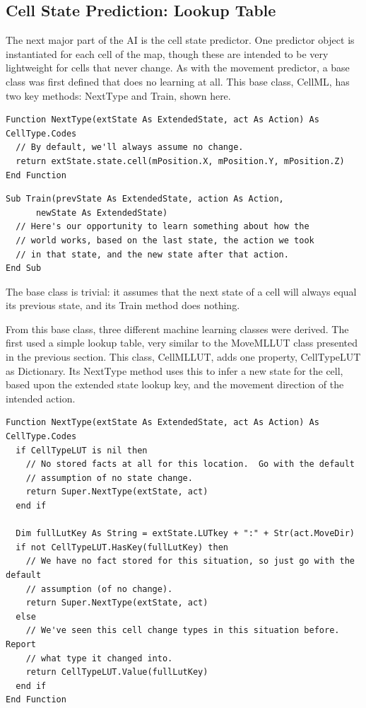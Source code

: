 \documentclass{article}
\begin{document}
\subsection{Cell State Prediction: Lookup Table}

The next major part of the AI is the cell state predictor.  One predictor object is instantiated for each cell of the map, though these are intended to be very lightweight for cells that never change.  As with the movement predictor, a base class was first defined that does no learning at all.  This base class, CellML, has two key methods: NextType and Train, shown here.

\begin{lstlisting}
Function NextType(extState As ExtendedState, act As Action) As CellType.Codes
  // By default, we'll always assume no change.
  return extState.state.cell(mPosition.X, mPosition.Y, mPosition.Z)
End Function
\end{lstlisting}

\begin{lstlisting}
Sub Train(prevState As ExtendedState, action As Action,
      newState As ExtendedState)
  // Here's our opportunity to learn something about how the
  // world works, based on the last state, the action we took
  // in that state, and the new state after that action.
End Sub
\end{lstlisting}

The base class is trivial: it assumes that the next state of a cell will always equal its previous state, and its Train method does nothing.

From this base class, three different machine learning classes were derived.  The first used a simple lookup table, very similar to the MoveMLLUT class presented in the previous section.  This class, CellMLLUT, adds one property, CellTypeLUT as Dictionary.  Its NextType method uses this to infer a new state for the cell, based upon the extended state lookup key, and the movement direction of the intended action.

\begin{lstlisting}
Function NextType(extState As ExtendedState, act As Action) As CellType.Codes
  if CellTypeLUT is nil then
    // No stored facts at all for this location.  Go with the default
    // assumption of no state change.
    return Super.NextType(extState, act)
  end if
  
  Dim fullLutKey As String = extState.LUTkey + ":" + Str(act.MoveDir)
  if not CellTypeLUT.HasKey(fullLutKey) then
    // We have no fact stored for this situation, so just go with the default
    // assumption (of no change).
    return Super.NextType(extState, act)
  else
    // We've seen this cell change types in this situation before.  Report
    // what type it changed into.
    return CellTypeLUT.Value(fullLutKey)
  end if
End Function
\end{lstlisting}
\end{document}

